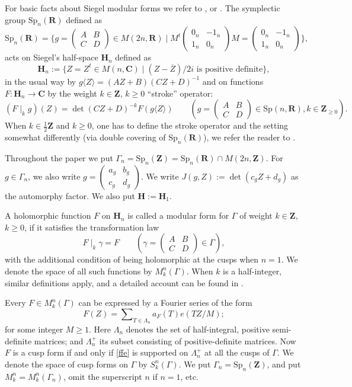 \documentclass[12pt]{amsart}
\numberwithin{equation}{section}
\theoremstyle{plain}
\theoremstyle{definition}
\newcommand{\z}{\mf Z}
\newcommand{\h}{\mf H}
\newcommand{\mf}{\mathbf}
\newcommand{\mrm}{\mathrm}
\newcommand{\R}{\mf{R}}
\newcommand{\spn}{\mrm{Sp}_n(\mf Z)}
\newcommand{\spnr}{\mrm{Sp}_n( \mf R)}
\newcommand{\skgam}{S^n_k(\Gamma)}
\newcommand{\mkngam}{M^n_k(\Gamma)}
\newcommand{\sumn}{\sum \nolimits}
\newcommand{\smat}[4]{\left( \begin{smallmatrix}#1&#2\\#3&#4\end{smallmatrix}\right)}
\newcommand{\psmb}{\left( \begin{smallmatrix}}
\newcommand{\psme}{ \end{smallmatrix} \right) }
\begin{document}
For basic facts about Siegel modular forms we refer to \cite{andrianov2}, \cite{freitag} or 
\cite{klingen1}. The symplectic group $\spnr$ defined as
\[ \spnr = \{ g= \smat{A}{B}{C}{D} \in M({2n},\R) \mid M^t \smat{0_n}{-1_n}{1_n}{0_n}M= \smat{0_n}{-1_n}{1_n}{0_n} \} ,\]
acts on Siegel's half-space $\mf H_n$ defined as 
 \[  { \mf H_n := \{ Z= Z^t \in M(n, \mf C) \mid (Z - \overline{Z})/2i \text{ is positive definite} \}, } \] 
in the usual way by $g \langle Z \rangle=(AZ+B)(CZ+D)^{-1}$ and
on functions $F:{\mf H}_n\longrightarrow {\mf C}$ by the {weight $k \in \z$, $k \ge 0$} ``stroke'' operator:
\[ (F\mid_kg)(Z)= \det(CZ+D)^{-k} F(g \langle Z \rangle) \qquad  (g=\left(
\begin{smallmatrix}
A & B\\ C & D\end{smallmatrix}\right)\in \mrm{Sp}(n, \mf R), k \in \mf Z_{\geq0} ). \] 
When $k \in \frac{1}{2} \z$ and $k \ge 0$, one has to define the stroke operator and the setting somewhat differently (via double covering of $\spnr$), we refer the reader to \cite[(4.37)~Chapter~1]{andrianov2}.

Throughout the paper we put $\Gamma_n=\spn=\spnr \cap M(2n, \z)$.
For $g \in \Gamma_n$, we also write $g= \psmb a_g & b_g \\ c_g & d_g \psme$. 
We write $\displaystyle J(g,Z) := \det(c_g Z+d_g)$ as the automorphy factor. We also put $\h:= \mf H_1$.

A holomorphic function $F$ on
${\mf H}_n$ is called a modular form for $\Gamma$ of weight $k \in \z$, $k \ge 0$, if it satisfies the transformation law
\[ F\mid_k\gamma= F \qquad (\gamma=\left(\begin{smallmatrix}
A & B \\ C & D\end{smallmatrix}\right)\in \Gamma), \]
with the additional condition of being holomorphic at the cusps when $n=1$.
We denote the space of all such functions by $M^n_k(\Gamma)$. When $k$ is a half-integer, similar definitions apply, and a detailed account can be found in \cite[Chapter~2, \S~2]{andrianov2}.

Every $F \in \mkngam$ can be expressed by a Fourier series of the form
\begin{equation} \label{ffe}
    F(Z) = \sumn_{T \in \Lambda_n } a_F(T) e(TZ/M);
\end{equation}
for some integer $M \ge 1$. Here $\Lambda_n$ denotes the set of half-integral, positive semi-definite matrices; and $\Lambda_n^+$ its subset consisting of positive-definite matrices. Now $F$ is a cusp form if and only if \eqref{ffe} is supported on $\Lambda_n^+$ at all the cusps of $\Gamma$. We denote the space of cusp forms on $\Gamma$ by $\skgam$.
We put $\Gamma_n=\spn$, and put $M^n_k=M^n_k(\Gamma_n)$, omit the superscript $n$ if $n=1$, etc.
\end{document}
